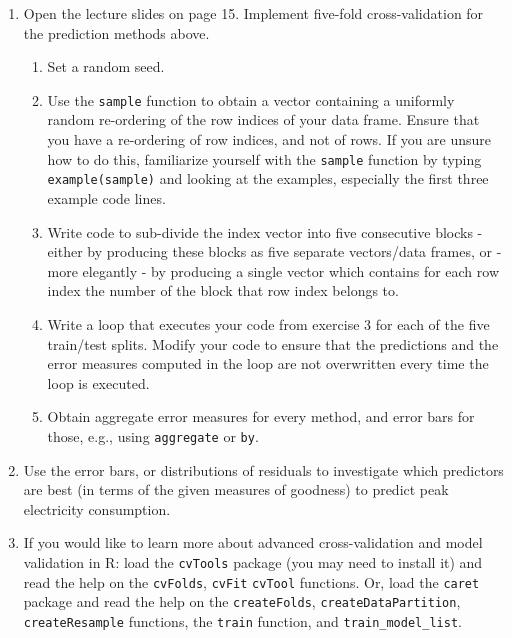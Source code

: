 \begin{enumerate}
\item Open the lecture slides on page 15. Implement five-fold cross-validation for the prediction methods above. 
\begin{enumerate}
\item Set a random seed.
\item Use the \texttt{sample} function to obtain a vector containing a uniformly random re-ordering of the row indices of your data frame. Ensure that you have a re-ordering of row indices, and not of rows. If you are unsure how to do this, familiarize yourself with the \texttt{sample} function by typing \texttt{example(sample)} and looking at the examples, especially the first three example code lines.
\item Write code to sub-divide the index vector into five consecutive blocks - either by producing these blocks as five separate vectors/data frames, or - more elegantly - by producing a single vector which contains for each row index the number of the block that row index belongs to.
\item Write a loop that executes your code from exercise 3 for each of the five train/test splits. Modify your code to ensure that the predictions and the error measures computed in the loop are not overwritten every time the loop is executed.
\item Obtain aggregate error measures for every method, and error bars for those, e.g., using \texttt{aggregate} or \texttt{by}.
\end{enumerate}

\item Use the error bars, or distributions of residuals to investigate which predictors are best (in terms of the given measures of goodness) to predict peak electricity consumption.

\item If you would like to learn more about advanced cross-validation and model validation in R: load the \texttt{cvTools} package (you may need to install it) and read the help on the \texttt{cvFolds}, \texttt{cvFit} \texttt{cvTool} functions. Or, load the \texttt{caret} package and read the help on the \texttt{createFolds}, \texttt{createDataPartition}, \texttt{createResample} functions, the \texttt{train} function, and \texttt{train\_model\_list}.


\end{enumerate}
